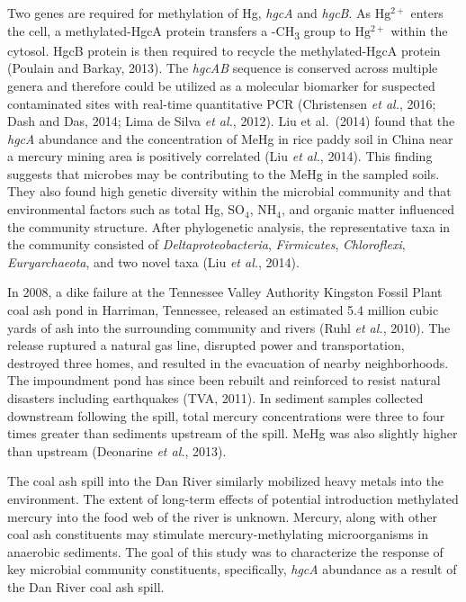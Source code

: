 \documentclass[ms, hidelinks]{uncgdissertationexp}
\theoremstyle{plain}
\theoremstyle{definition}
\theoremstyle{remark}
\begin{document}
Two genes are required for methylation of Hg, \emph{hgcA} and \emph{hgcB}. As \(\mathrm{Hg^{2+}}\) enters the cell, a methylated-HgcA protein transfers a -CH\textsubscript{3} group to \(\mathrm{Hg^{2+}}\) within the cytosol. HgcB protein is then required to recycle the methylated-HgcA protein (Poulain and Barkay, 2013). The \emph{hgcAB} sequence is conserved across multiple genera and therefore could be utilized as a molecular biomarker for suspected contaminated sites with real-time quantitative PCR (Christensen \emph{et al.}, 2016; Dash and Das, 2014; Lima de Silva \emph{et al.}, 2012). Liu et al.~(2014) found that the \emph{hgcA} abundance and the concentration of MeHg in rice paddy soil in China near a mercury mining area is positively correlated (Liu \emph{et al.}, 2014). This finding suggests that microbes may be contributing to the MeHg in the sampled soils. They also found high genetic diversity within the microbial community and that environmental factors such as total Hg, \(\mathrm{SO_4}\), \(\mathrm{NH_4}\), and organic matter influenced the community structure. After phylogenetic analysis, the representative taxa in the community consisted of \emph{Deltaproteobacteria}, \emph{Firmicutes}, \emph{Chloroflexi}, \emph{Euryarchaeota}, and two novel taxa (Liu \emph{et al.}, 2014).

In 2008, a dike failure at the Tennessee Valley Authority Kingston Fossil Plant coal ash pond in Harriman, Tennessee, released an estimated 5.4 million cubic yards of ash into the surrounding community and rivers (Ruhl \emph{et al.}, 2010). The release ruptured a natural gas line, disrupted power and transportation, destroyed three homes, and resulted in the evacuation of nearby neighborhoods. The impoundment pond has since been rebuilt and reinforced to resist natural disasters including earthquakes (TVA, 2011). In sediment samples collected downstream following the spill, total mercury concentrations were three to four times greater than sediments upstream of the spill. MeHg was also slightly higher than upstream (Deonarine \emph{et al.}, 2013).

The coal ash spill into the Dan River similarly mobilized heavy metals into the environment. The extent of long-term effects of potential introduction methylated mercury into the food web of the river is unknown. Mercury, along with other coal ash constituents may stimulate mercury-methylating microorganisms in anaerobic sediments. The goal of this study was to characterize the response of key microbial community constituents, specifically, \emph{hgcA} abundance as a result of the Dan River coal ash spill.
\end{document}
